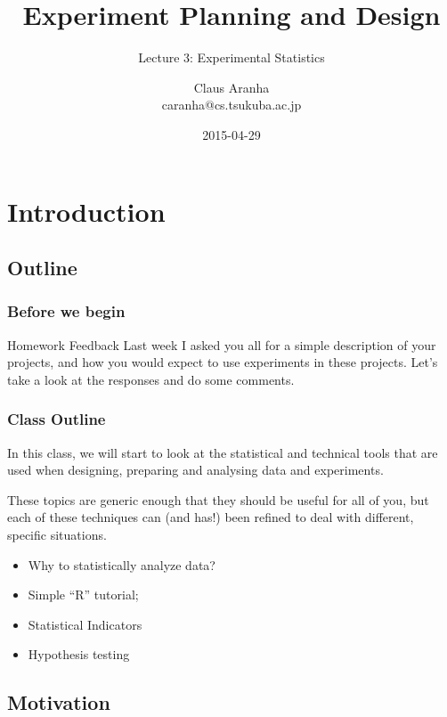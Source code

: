 \documentclass[10pt]{beamer}
\title[]{Experiment Planning and Design}
\subtitle[]{Lecture 3: Experimental Statistics}
\author[Claus Aranha]{Claus Aranha\\{\footnotesize caranha@cs.tsukuba.ac.jp}}
\institute{Department of Computer Science}
\date{2015-04-29}
\begin{document}
\section{Introduction}
\subsection{Outline}

\begin{frame}
  \maketitle
\end{frame}

\begin{frame}
  \frametitle{Before we begin} 

  \begin{block}{Homework Feedback}
  Last week I asked you all for a simple description of your projects,
  and how you would expect to use experiments in these projects. Let's
  take a look at the responses and do some comments.
  \end{block}

\end{frame}

\begin{frame}
  \frametitle{Class Outline}
  \begin{block}{}
    In this class, we will start to look at the statistical and
    technical tools that are used when designing, preparing and
    analysing data and experiments.
  \end{block}
  \begin{block}{}
    These topics are generic enough that they should be useful for all
    of you, but each of these techniques can (and has!) been refined
    to deal with different, specific situations.
  \end{block}

  \bigskip

  \begin{itemize}
  \item Why to statistically analyze data?
  \item Simple ``R'' tutorial;
  \item Statistical Indicators
  \item Hypothesis testing
  \end{itemize}
\end{frame}

\subsection{Motivation}
\end{document}
